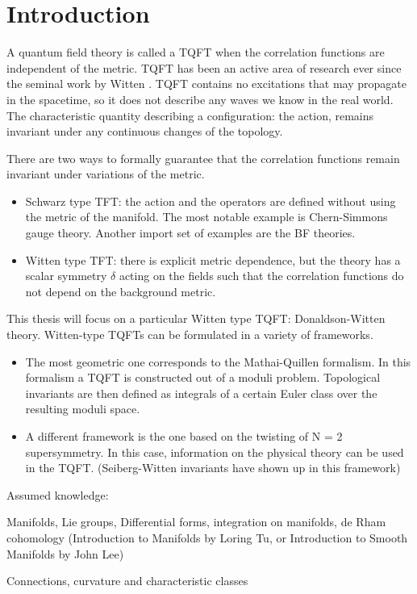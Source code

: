 \section{Introduction}

A quantum field theory is called a TQFT when the correlation functions are
independent of the metric. 
TQFT has been an active area of research ever since the seminal work by Witten
\cite{wittenTQFT}. TQFT contains no excitations that may propagate in the
spacetime, so it does not describe any waves we know in the real world. The
characteristic quantity describing a configuration: the action, remains
invariant under any continuous changes of the topology. 

There are two ways to formally guarantee that the correlation functions remain
invariant under variations of the metric. %
\begin{itemize}
	\item Schwarz type TFT: the action and the operators are defined without 
		using the metric of the manifold. The most notable example is
		Chern-Simmons gauge theory. Another import set of examples are the BF
		theories. 
	\item Witten type TFT: there is explicit metric
	dependence, but the theory has a scalar symmetry $\delta$ acting on
	the fields such that the correlation
	functions do not depend on the background metric. 
\end{itemize}

This thesis will focus on a particular Witten type TQFT: Donaldson-Witten
theory. Witten-type TQFTs can be formulated in a variety of frameworks. 
\begin{itemize}
	\item 
 The most geometric one corresponds to the Mathai-Quillen formalism. In this
formalism a TQFT is constructed out of a moduli problem. Topological invariants
are then defined as integrals of a certain Euler class over the resulting moduli
space.\cite{cernTQFT}
	\item 
 A different framework is the one based on the twisting of N = 2 supersymmetry.
In this case, information on the physical theory can be used in the
TQFT. (Seiberg-Witten invariants have shown up in this framework)
\end{itemize}



Assumed knowledge:

Manifolds, Lie groups, Differential forms, integration on manifolds, de Rham cohomology
(Introduction to Manifolds by Loring Tu, or Introduction to Smooth Manifolds by
John Lee) 

Connections, curvature and characteristic classes \cite{loringtu}

